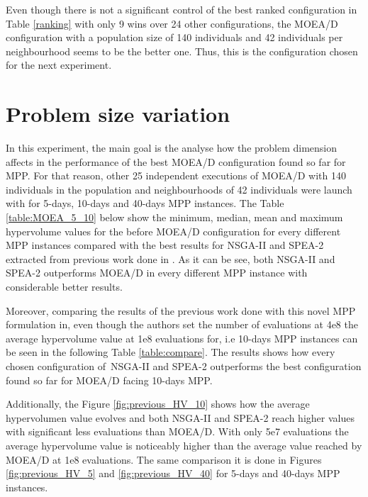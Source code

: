 Even though there is not a significant control of the best ranked configuration in Table \ref{ranking} with only 9 wins over 24 other configurations, the MOEA/D configuration with a population size of 140 individuals and 42 individuals per neighbourhood seems to be the better one. Thus, this is the configuration chosen for the next experiment.


\newpage

\section{Problem size variation}
In this experiment, the main goal is the analyse how the problem dimension affects in the performance of the best MOEA/D configuration found so far for MPP. For that reason, other 25 independent executions of MOEA/D with 140 individuals in the population and neighbourhoods of 42 individuals were launch with for 5-days, 10-days and 40-days MPP instances. The Table \ref{table:MOEA_5_10} below show the minimum, median, mean and maximum hypervolume values for the before MOEA/D configuration for every different MPP instances compared with the best results for NSGA-II and SPEA-2 extracted from previous work done in \cite{Miranda2018}. As it can be see, both NSGA-II and SPEA-2 outperforms MOEA/D in every different MPP instance with considerable better results.




Moreover, comparing the results of the previous work done with this novel MPP formulation in\cite{Miranda2018}, even though the authors set the number of evaluations at 4e8 the average hypervolume value at 1e8 evaluations for, i.e 10-days MPP instances can be seen in the following Table \ref{table:compare}. The results shows how every chosen configuration of~NSGA-II and SPEA-2 outperforms the best configuration found so far for MOEA/D facing 10-days MPP. 



Additionally, the Figure \ref{fig:previous_HV_10} shows how the average hypervolumen value evolves and both NSGA-II and SPEA-2 reach higher values with significant less evaluations than MOEA/D. With only 5e7 evaluations the average hypervolume value is noticeably higher than the average value reached by MOEA/D at 1e8 evaluations. The same comparison it is done in Figures \ref{fig:previous_HV_5} and \ref{fig:previous_HV_40} for 5-days and 40-days MPP instances.


